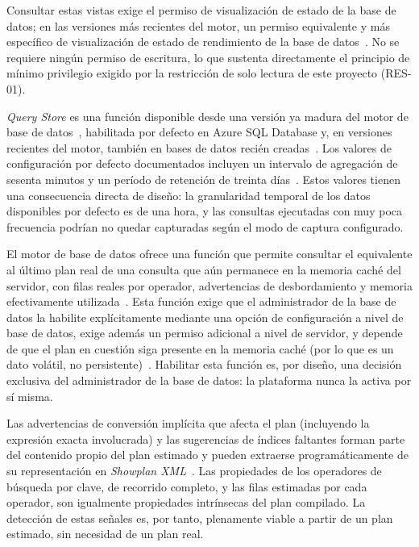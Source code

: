\documentclass[11pt,a4paper]{report}
\begin{document}
\begin{description}[leftmargin=1.6cm,style=nextline]
\item[Hallazgo F4 -- Permisos necesarios.] Consultar estas vistas exige el permiso de visualizaci\'on de estado de la base de datos; en las versiones m\'as recientes del motor, un permiso equivalente y m\'as espec\'ifico de visualizaci\'on de estado de rendimiento de la base de datos~\cite{R5}. No se requiere ning\'un permiso de escritura, lo que sustenta directamente el principio de m\'inimo privilegio exigido por la restricci\'on de solo lectura de este proyecto (RES-01).

\item[Hallazgo F5 -- Disponibilidad y valores por defecto de \textit{Query Store}.] \textit{Query Store} es una funci\'on disponible desde una versi\'on ya madura del motor de base de datos~\cite{R4}, habilitada por defecto en Azure SQL Database y, en versiones recientes del motor, tambi\'en en bases de datos reci\'en creadas~\cite{R9}. Los valores de configuraci\'on por defecto documentados incluyen un intervalo de agregaci\'on de sesenta minutos y un per\'iodo de retenci\'on de treinta d\'ias~\cite{R8}. Estos valores tienen una consecuencia directa de dise\~no: la granularidad temporal de los datos disponibles por defecto es de una hora, y las consultas ejecutadas con muy poca frecuencia podr\'ian no quedar capturadas seg\'un el modo de captura configurado.

\item[Hallazgo F6 -- El plan real existe, pero es una funci\'on opcional.] El motor de base de datos ofrece una funci\'on que permite consultar el equivalente al \'ultimo plan real de una consulta que a\'un permanece en la memoria cach\'e del servidor, con filas reales por operador, advertencias de desbordamiento y memoria efectivamente utilizada~\cite{R7}. Esta funci\'on exige que el administrador de la base de datos la habilite expl\'icitamente mediante una opci\'on de configuraci\'on a nivel de base de datos, exige adem\'as un permiso adicional a nivel de servidor, y depende de que el plan en cuesti\'on siga presente en la memoria cach\'e (por lo que es un dato vol\'atil, no persistente)~\cite{R7}. Habilitar esta funci\'on es, por dise\~no, una decisi\'on exclusiva del administrador de la base de datos: la plataforma nunca la activa por s\'i misma.

\item[Hallazgo F7 -- La evidencia de compilaci\'on s\'i est\'a en el plan almacenado.] Las advertencias de conversi\'on impl\'icita que afecta el plan (incluyendo la expresi\'on exacta involucrada) y las sugerencias de \'indices faltantes forman parte del contenido propio del plan estimado y pueden extraerse program\'aticamente de su representaci\'on en \textit{Showplan XML}~\cite{R11}. Las propiedades de los operadores de b\'usqueda por clave, de recorrido completo, y las filas estimadas por cada operador, son igualmente propiedades intr\'insecas del plan compilado. La detecci\'on de estas se\~nales es, por tanto, plenamente viable a partir de un plan estimado, sin necesidad de un plan real.


\end{description}
\end{document}
